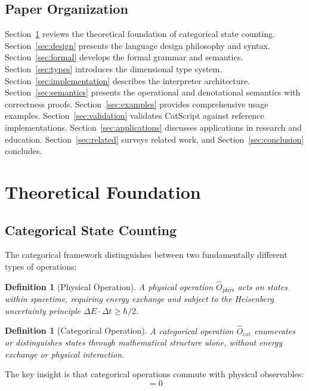 \documentclass[twocolumn,10pt]{article}
\newtheorem{definition}[theorem]{Definition}
\begin{document}
\subsection{Paper Organization}

Section~\ref{sec:theoretical} reviews the theoretical foundation of categorical state counting. Section~\ref{sec:design} presents the language design philosophy and syntax. Section~\ref{sec:formal} develops the formal grammar and semantics. Section~\ref{sec:types} introduces the dimensional type system. Section~\ref{sec:implementation} describes the interpreter architecture. Section~\ref{sec:semantics} presents the operational and denotational semantics with correctness proofs. Section~\ref{sec:examples} provides comprehensive usage examples. Section~\ref{sec:validation} validates CatScript against reference implementations. Section~\ref{sec:applications} discusses applications in research and education. Section~\ref{sec:related} surveys related work, and Section~\ref{sec:conclusion} concludes.

\section{Theoretical Foundation}
\label{sec:theoretical}

\subsection{Categorical State Counting}

The categorical framework distinguishes between two fundamentally different types of operations:

\begin{definition}[Physical Operation]
A physical operation $\hat{O}_{\text{phys}}$ acts on states within spacetime, requiring energy exchange and subject to the Heisenberg uncertainty principle $\Delta E \cdot \Delta t \geq \hbar/2$.
\end{definition}

\begin{definition}[Categorical Operation]
A categorical operation $\hat{O}_{\text{cat}}$ enumerates or distinguishes states through mathematical structure alone, without energy exchange or physical interaction.
\end{definition}

The key insight is that categorical operations commute with physical observables:
\begin{equation}
    [\hat{O}_{\text{cat}}, \hat{O}_{\text{phys}}] = 0
\end{equation}
\end{document}
